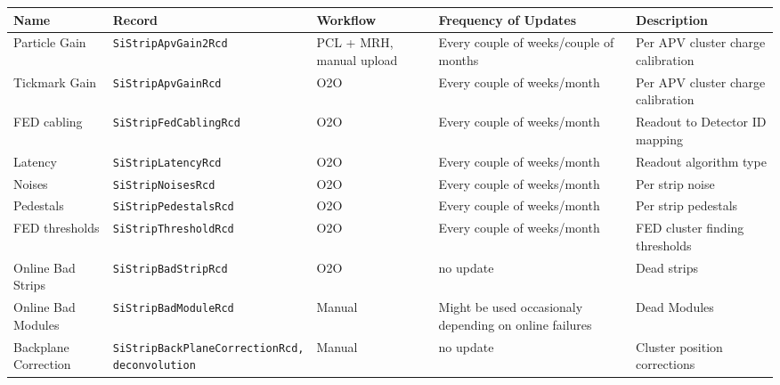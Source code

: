 \begin{table}[h!]
    \centering
    \begin{adjustbox}{max width=\textwidth}
    \begin{tabular}{p{3.4cm}|p{4.6cm}|p{2.5cm}|p{2.5cm}|p{3.5cm}}
        \textbf{Name} & \textbf{Record} & \textbf{Workflow} & \textbf{Frequency of Updates} & \textbf{Description} \\ \hline
      Particle Gain              & \texttt{SiStripApvGain2Rcd}             &   PCL + MRH, manual upload              & Every couple of weeks/couple of months  & Per APV cluster charge calibration  \\ \hline
      Tickmark Gain              & \texttt{SiStripApvGainRcd}              &   O2O                                   & Every couple of weeks/month             & Per APV cluster charge calibration  \\ \hline
      FED cabling                & \texttt{SiStripFedCablingRcd}           &   O2O                                   & Every couple of weeks/month             & Readout to Detector ID mapping  \\ \hline
      Latency                    & \texttt{SiStripLatencyRcd}              &   O2O                                   & Every couple of weeks/month             & Readout algorithm type  \\ \hline     
      Noises                     & \texttt{SiStripNoisesRcd}               &   O2O                                   & Every couple of weeks/month             & Per strip noise  \\ \hline
      Pedestals                  & \texttt{SiStripPedestalsRcd}            &   O2O                                   & Every couple of weeks/month             & Per strip pedestals  \\ \hline
      FED thresholds             & \texttt{SiStripThresholdRcd}            &   O2O                                   & Every couple of weeks/month             & FED cluster finding thresholds  \\ \hline
      Online Bad Strips          & \texttt{SiStripBadStripRcd}             &   O2O                                   & no update                               & Dead strips  \\ \hline  
      Online Bad Modules         & \texttt{SiStripBadModuleRcd}            &   Manual                                & Might be used occasionaly depending on online failures & Dead Modules  \\ \hline   
      Backplane Correction       & \parbox[t]{5cm}{\texttt{SiStripBackPlaneCorrectionRcd,}\\\texttt{deconvolution}}  &   Manual                   & no update                               & Cluster position corrections  \\ \hline      

\end{tabular}
\end{adjustbox}
\end{table}
